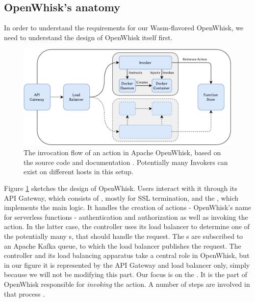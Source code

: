 \subsection{OpenWhisk's anatomy}

In order to understand the requirements for our Wasm-flavored OpenWhisk, we need to understand the design of OpenWhisk itself first.

\begin{figure}
    \includegraphics{figures/OpenWhiskActionInvocationFlow.pdf}
    \caption{The invocation flow of an action in Apache OpenWhisk, based on the source code and documentation \cite{OpenWhiskSystemDesign}. Potentially many Invokers can exist on different hosts in this setup.}
    \label{fig:openwhisk-action-invocation-flow}
\end{figure}

Figure \ref{fig:openwhisk-action-invocation-flow} sketches the design of OpenWhisk. Users interact with it through its API Gateway, which consists of , mostly for SSL termination, and the , which implements the main logic. It handles the creation of actions - OpenWhisk's name for serverless functions - authentication and authorization as well as invoking the action.
In the latter case, the controller uses its load balancer to determine one of the potentially many s, that should handle the request. The s are subscribed to an Apache Kafka queue, to which the load balancer publishes the request. The controller and its load balancing apparatus take a central role in OpenWhisk, but in our figure it is represented by the API Gateway and load balancer only, simply because we will not be modifying this part.
Our focus is on the . It is the part of OpenWhisk responsible for \emph{invoking} the action. A number of steps are involved in that process \cite{OpenWhiskSystemDesign}.

